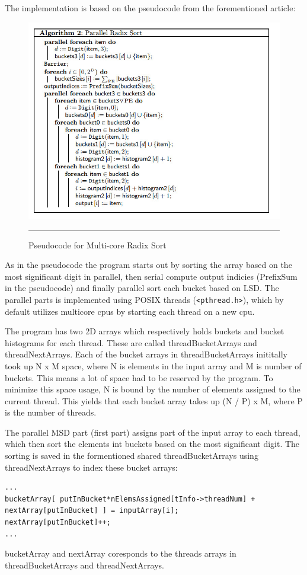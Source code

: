 The implementation is based on the pseudocode from the forementioned article:
\begin{figure}[htbp]
	\centering
		\includegraphics[width=\textwidth]{./Figures/Project2b/MultiCoreRadix_Pseudo.jpg}
		\rule{35em}{0.5pt}
	\caption[Multicore radix pseudocode]{
	Pseudocode for Multi-core Radix Sort
	}
	\label{fig:Branch_misses}
\end{figure}
As in the pseudocode the program starts out by sorting the array based on the most significant digit in parallel, then serial compute output indicies (PrefixSum in the pseudocode) and finally parallel sort each bucket based on LSD.  
The parallel parts is implemented using POSIX threads (\verb!<pthread.h>!), which by default utilizes multicore cpus by starting each thread on a new cpu.

The program has two 2D arrays which respectively holds buckets and bucket histograms for each thread. These are called threadBucketArrays and threadNextArrays.
Each of the bucket arrays in threadBucketArrays inititally took up N x M space, where N is elements in the input array and M is number of buckets.
This means a lot of space had to be reserved by the program. To minimize this space usage, N is bound by the number of elements assigned to the current thread.
This yields that each bucket array takes up (N / P) x M, where P is the number of threads. 

The parallel MSD part (first part) assigns part of the input array to each thread, which then sort the elements int buckets based on the most significant digit.
The sorting is saved in the formentioned shared threadBucketArrays using threadNextArrays to index these bucket arrays:
\begin{lstlisting}
...
bucketArray[ putInBucket*nElemsAssigned[tInfo->threadNum] + nextArray[putInBucket] ] = inputArray[i];
nextArray[putInBucket]++; 
... 
\end{lstlisting}
bucketArray and nextArray coresponds to the threads arrays in threadBucketArrays and threadNextArrays.

